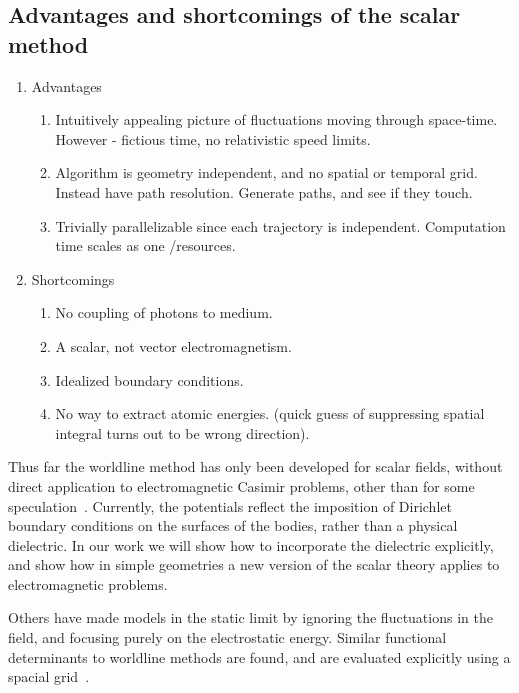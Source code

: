   \subsection{Advantages and shortcomings of the scalar method}
\begin{enumerate}
  \item Advantages

  \begin{enumerate}
    \item Intuitively appealing picture of fluctuations moving through space-time.
      However - fictious time, no relativistic speed limits.  
    \item Algorithm is geometry independent, and no spatial or temporal grid.
      Instead have path resolution.  
      Generate paths, and see if they touch.
  \item Trivially parallelizable since each trajectory is independent. 
      Computation time scales as one /resources.  
  \end{enumerate}

  \item Shortcomings
    \begin{enumerate}
      \item No coupling of photons to medium.
      \item A scalar, not vector electromagnetism.
      \item Idealized boundary conditions.  
      \item No way to extract atomic energies.  (quick guess of suppressing spatial integral turns 
        out to be wrong direction).
    \end{enumerate}
  
\end{enumerate}

Thus far the worldline method has only been developed for scalar fields, 
without direct application to electromagnetic Casimir problems, 
other than for some speculation~\cite{Aehlig2011}.
  Currently, the potentials reflect the imposition of Dirichlet boundary 
conditions on the surfaces of the bodies, rather than a physical dielectric.
   In our work we will show how to incorporate the dielectric explicitly, 
and show how in simple geometries a new version of the scalar theory applies
 to electromagnetic problems.  

Others have made models in the static limit by ignoring the fluctuations in the field,
and focusing purely on the electrostatic energy.
 Similar functional determinants to worldline methods are found,
 and are evaluated explicitly using a spacial grid~\cite{Pasquali2008}.  

